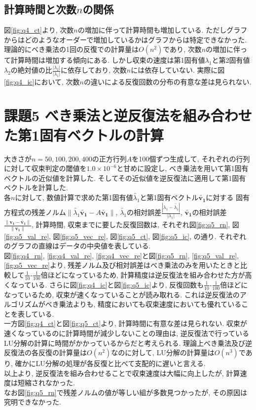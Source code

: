 \documentclass[uplatex,a4j]{jsarticle}
\begin{document}
\subsection{計算時間と次数$n$の関係}
\label{sec:q4_3}
図\ref{fig:q4_ct}より, 次数$n$の増加に伴って計算時間も増加している. 
ただしグラフからはどのようなオーダーで増加しているかはグラフからは特定できなかった. 
理論的にべき乗法の1回の反復での計算量は$O(n^2)$であり, 次数$n$の増加に伴って計算時間は増加する傾向にある. 
しかし収束の速度は第1固有値$\lambda_1$と第2固有値$\lambda_2$の絶対値の比$\frac{|\lambda_2|}{|\lambda_1|}$に依存しており, 
次数$n$には依存していない. 
実際に図\ref{fig:q4_ic}において, 次数$n$の違いによる反復回数の分布の有意な差は見られない. 


\section{課題5 べき乗法と逆反復法を組み合わせた第1固有ベクトルの計算}
\label{sec:q5}
大きさが$n = 50,100,200,400$の正方行列$A$を100個ずつ生成して, 
それぞれの行列に対して収束判定の閾値を$1.0 \times 10^{-6}$と甘めに設定し, 
べき乗法を用いて第1固有ベクトルの近似値を計算した. 
そしてその近似値を逆反復法に適用して第1固有ベクトルを計算した. \\
各$n$に対して, 数値計算で求めた第1固有値$\tilde{\lambda_1}$と第1固有ベクトル$\bm{\tilde{v_1}}$に対する
固有方程式の残差ノルム$\| \tilde{\lambda_1}\bm{\tilde{v_1}} - A \bm{\tilde{v_1}} \|$, 
$\tilde{\lambda_1}$の相対誤差$\frac{|\lambda_1 - \tilde{\lambda_1}|}{|\lambda_1|}$, 
$\bm{\tilde{v_1}}$の相対誤差$\frac{\| \bm{v_1} - \bm{\tilde{v_1}} \|}{\| \bm{v_1} \|}$, 
計算時間, 収束までに要した反復回数は, 
それぞれ図\ref{fig:q5_rn}, 図\ref{fig:q5_val_re}, 図\ref{fig:q5_vec_re}, 図\ref{fig:q5_ct}, 図\ref{fig:q5_ic}, の通り. 
それぞれのグラフの直線はデータの中央値を表している. \\
図\ref{fig:q4_rn}, \ref{fig:q4_val_re}, \ref{fig:q4_vec_re}と図\ref{fig:q5_rn}, \ref{fig:q5_val_re}, \ref{fig:q5_vec_re}より, 
残差ノルム及び相対誤差はべき乗法のみを用いたときと比較して$\frac{1}{10}$-$\frac{1}{100}$倍ほどになっているため, 
計算精度は逆反復法を組み合わせた方が高くなっている. 
さらに図\ref{fig:q4_ic}と図\ref{fig:q5_ic}より, 
反復回数も$\frac{1}{10}$-$\frac{1}{100}$倍ほどになっているため, 収束が速くなっていることが読み取れる. 
これは逆反復法のアルゴリズムがべき乗法よりも, 精度においても収束速度においても優れていることを表している. \\
一方図\ref{fig:q4_ct}と図\ref{fig:q5_ct}より, 計算時間に有意な差は見られない. 
収束が速くなっているのに計算時間が減少しないことの理由は, 
逆反復法で行っているLU分解の計算に時間がかかっているからだと考えられる. 
理論上べき乗法及び逆反復法の各反復の計算量は$O(n^2)$なのに対して, LU分解の計算量は$O(n^3)$であり, 
確かにLU分解の処理が各反復と比べて支配的に遅いと言える. \\
以上より, 逆反復法を組み合わせることで収束速度は大幅に向上したが, 計算速度は短縮されなかった. \\
なお図\ref{fig:q5_rn}で残差ノルムの値が等しい組が多数見つかったが, 
その原因は究明できなかった. 
\end{document}
